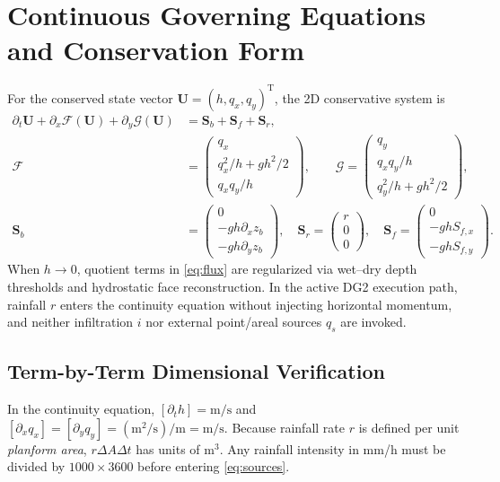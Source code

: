 \documentclass[11pt,a4paper]{article}
\newcommand{\unit}[1]{\mathrm{#1}}
\begin{document}
\section{Continuous Governing Equations and Conservation Form}
\label{sec:ecuaciones}
For the conserved state vector $\boldsymbol U=(h,q_x,q_y)^{\mathrm T}$, the 2D conservative system is
\begin{align}
\partial_t\boldsymbol U+\partial_x\mathcal F(\boldsymbol U)+\partial_y\mathcal G(\boldsymbol U)&=\boldsymbol S_b+\boldsymbol S_f+\boldsymbol S_r,\label{eq:conserv}\\
\mathcal F&=\begin{pmatrix}q_x\\ q_x^2/h+gh^2/2\\q_xq_y/h\end{pmatrix},\qquad
\mathcal G=\begin{pmatrix}q_y\\q_xq_y/h\\q_y^2/h+gh^2/2\end{pmatrix},\label{eq:flux}\\
\boldsymbol S_b&=\begin{pmatrix}0\\-gh\partial_xz_b\\-gh\partial_yz_b\end{pmatrix},\quad
\boldsymbol S_r=\begin{pmatrix}r\\0\\0\end{pmatrix},\quad
\boldsymbol S_f=\begin{pmatrix}0\\-ghS_{f,x}\\-ghS_{f,y}\end{pmatrix}.\label{eq:sources}
\end{align}
When $h\to 0$, quotient terms in \eqref{eq:flux} are regularized via wet--dry depth thresholds and hydrostatic face reconstruction. In the active DG2 execution path, rainfall $r$ enters the continuity equation without injecting horizontal momentum, and neither infiltration $i$ nor external point/areal sources $q_s$ are invoked.

\subsection{Term-by-Term Dimensional Verification}
In the continuity equation, $[\partial_t h]=\unit{m/s}$ and $[\partial_xq_x]=[\partial_yq_y]=(\unit{m^2/s})/\unit m=\unit{m/s}$. Because rainfall rate $r$ is defined per unit \emph{planform area}, $r\Delta A\Delta t$ has units of m$^3$. Any rainfall intensity in mm/h must be divided by $1000\times 3600$ before entering \eqref{eq:sources}.
\end{document}
